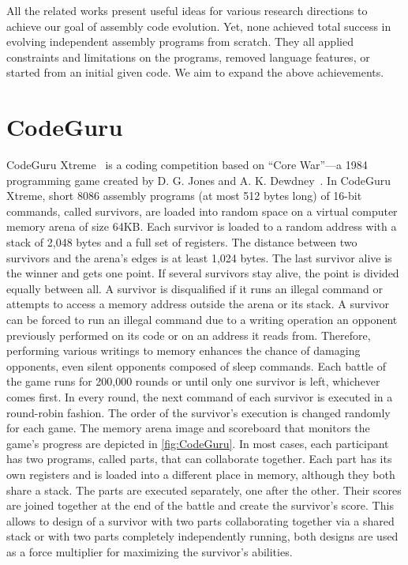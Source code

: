 \documentclass[dvipsnames, format=sigconf]{acmart}
\begin{document}

All the related works present useful ideas for various research directions to achieve our goal of assembly code evolution. Yet, none achieved total success in evolving independent assembly programs from scratch. They all applied constraints and limitations on the programs, removed language features, or started from an initial given code. We aim to expand the above achievements. 

\section{CodeGuru}
\label{sec:codeguru}
CodeGuru Xtreme~\cite{codeguru_repo} is a coding competition based on ``Core War''---a 1984 programming game created by D. G. Jones and A. K. Dewdney~\cite{dewdney1984recreational}.
In CodeGuru Xtreme, short 8086 assembly programs (at most 512 bytes long) of 16-bit commands, called survivors, are loaded into random space on a virtual computer memory arena of size 64KB. Each survivor is loaded to a random address with a stack of 2,048 bytes and a full set of registers. The distance between two survivors and the arena's edges is at least 1,024 bytes.
The last survivor alive is the winner and gets one point. If several survivors stay alive, the point is divided equally between all.
A survivor is disqualified if it runs an illegal command or attempts to access a memory address outside the arena or its stack. A survivor can be forced to run an illegal command due to a writing operation an opponent previously performed on its code or on an address it reads from. Therefore, performing various writings to memory enhances the chance of damaging opponents, even silent opponents composed of sleep commands.
Each battle of the game runs for 200,000 rounds or until only one survivor is left, whichever comes first. In every round, the next command of each survivor is executed in a round-robin fashion. The order of the survivor's execution is changed randomly for each game. The memory arena image and scoreboard that monitors the game's progress are depicted in \autoref{fig:CodeGuru}. In most cases, each participant has two programs, called parts, that can collaborate together. Each part has its own registers and is loaded into a different place in memory, although they both share a stack. The parts are executed separately, one after the other. Their scores are joined together at the end of the battle and create the survivor's score. This allows to design of a survivor with two parts collaborating together via a shared stack or with two parts completely independently running, both designs are used as a force multiplier for maximizing the survivor's abilities. 
\end{document}

